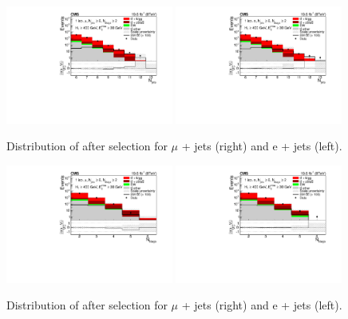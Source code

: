 \begin{figure}[ht!]
\centering
    \includegraphics[width=0.49\textwidth]{images/Run1/figures/NbOfSelectedJets_mu.pdf}
     \includegraphics[width=0.49\textwidth]{images/Run1/figures/NbOfSelectedJets_e.pdf}       
    \caption{Distribution of \njets after selection for $\mu$ + jets (right) and e + jets (left).}
    \label{fig:datasimnjets}
\end{figure}

\begin{figure}[ht!]
\centering
    \includegraphics[width=0.49\textwidth]{images/Run1/figures/NbOfSelectedBJets_mu.pdf}
     \includegraphics[width=0.49\textwidth]{images/Run1/figures/NbOfSelectedBJets_e.pdf}        
    \caption{Distribution of \nbtags after selection for $\mu$ + jets (right) and e + jets (left).}
    \label{fig:datasimnbtags}
\end{figure}

